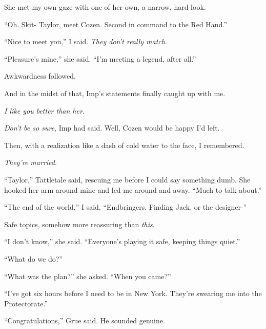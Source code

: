 She met my own gaze with one of her own, a narrow, hard look.



``Oh.  Skit- Taylor, meet Cozen.  Second in command to the Red Hand.''



``Nice to meet you,'' I said.  \emph{They don't really match}.



``Pleasure's mine,'' she said.  ``I'm meeting a legend, after all.''



Awkwardness followed.



And in the midst of that, Imp's statements finally caught up with me.



\emph{I like you better than her}.



\emph{Don't be so sure}, Imp had said.  Well, Cozen would be happy I'd left.



Then, with a realization like a dash of cold water to the face, I remembered.



\emph{They're married}.



``Taylor,'' Tattletale said, rescuing me before I could say something dumb.  She hooked her arm around mine and led me around and away.  ``Much to talk about.''



``The end of the world,'' I said.  ``Endbringers.  Finding Jack, or the designer-''



Safe topics, somehow more reassuring than \emph{this}.



``I don't know,'' she said.  ``Everyone's playing it safe, keeping things quiet.''



``What do we do?''



``What was the plan?'' she asked.  ``When you came?''



``I've got six hours before I need to be in New York.  They're swearing me into the Protectorate.''



``Congratulations,'' Grue said.  He sounded genuine.



